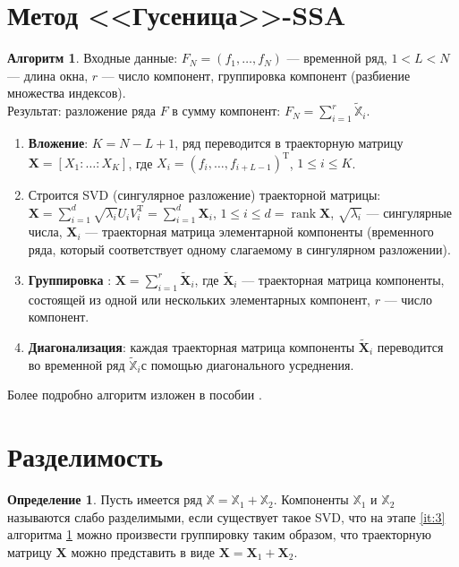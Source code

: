 \documentclass[specialist, substylefile = spbureport.rtx, subf,href,colorlinks=true, 12pt]{disser}
\theoremstyle{definition}
\newtheorem{definition}{Определение}
\newtheorem{algorithm}{Алгоритм}
\DeclareMathOperator{\rank}{rank}
\begin{document}
\section{Метод <<Гусеница>>-SSA}
\label{sec12}
\begin{algorithm}
\label{alg1}
    Входные данные: $F_N=(f_1, \ldots, f_N)$ --- временной ряд, $1<L<N$ --- длина окна, $r$ --- число компонент, группировка компонент (разбиение множества индексов).\\
    Результат: разложение ряда $F$ в сумму компонент: $F_N = \sum_{i = 1}^{r}\widetilde{\mathbb{X}}_i$.
    \begin{enumerate}
	    \item \textbf{Вложение}: $K=N-L+1$, ряд переводится в траекторную матрицу $\bm{X}=[X_1:\ldots:X_K]$, где $X_i = (f_i, \ldots, f_{i + L - 1})^{\mathrm{T}}$, $1 \leq i \leq K$.

	    \item Строится SVD (сингулярное разложение) траекторной матрицы: $\bm{X} = \sum\limits_{i=1}^d \sqrt{\lambda_i}U_iV_i^{\mathrm{T}} = \sum\limits_{i=1}^d\bm{X}_i$, $1 \leq i \leq d = \rank\bm{X}$, $\sqrt{\lambda_i}$ --- сингулярные числа, $\bm{X}_i$ --- траекторная матрица элементарной компоненты (временного ряда, который соответствует одному слагаемому в сингулярном разложении).

	    \item \textbf{Группировка} \label{it:3}: $\bm{X} =  \sum\limits_{i=1}^r \widetilde{\bm{X}}_i$, где $\widetilde{\bm{X}}_i$ --- траекторная матрица компоненты, состоящей из одной или нескольких элементарных компонент, $r$ --- число компонент.

	    \item \textbf{Диагонализация}: каждая траекторная матрица компоненты $\widetilde{\bm{X}}_i$ переводится во временной ряд $\widetilde{\mathbb{X}}_i$с помощью диагонального усреднения.
	\end{enumerate}
	Более подробно алгоритм изложен в пособии \cite{Golyandina04}.
\end{algorithm}

\section{Разделимость}

\begin{definition}
\label{def1}
        Пусть имеется ряд $\mathbb{X} = \mathbb{X}_1 + \mathbb{X}_2$. Компоненты $\mathbb{X}_1$ и $\mathbb{X}_2$ называются слабо разделимыми, если существует такое SVD, что на этапе \ref{it:3}  алгоритма \ref{alg1} можно произвести группировку таким образом, что траекторную матрицу $\mathbf{X}$ можно представить в виде $\mathbf{X} = \mathbf{X}_1 + \mathbf{X}_2$.
\end{definition}
\end{document}
